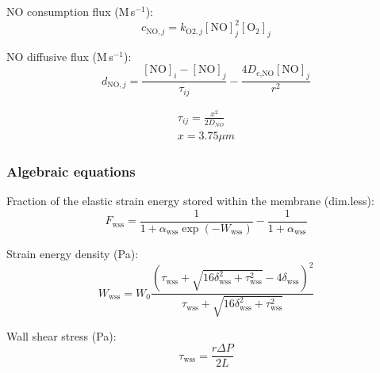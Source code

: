 \documentclass[fleqn]{report}
\numberwithin{equation}{section}
\numberwithin{equation}{section}
\newcommand{\NO}{\text{NO}}
\newcommand{\Otwo}{\text{O$_2$}}
\newcommand{\Ca}{\text{Ca$^{2+}$}}
\newcommand{\uMpers}{\textmu M\,s$^{-1}$}
\newcommand\cNO[1]{\text{$c_{\text{NO},#1}$}}
\newcommand\dNO[1]{\text{$d_{\text{NO},#1}$}}
\begin{document}
				NO consumption flux (\uMpers):
				\begin{equation} 
					\cNO{j} = k_{\text{O2},j} [\NO]_j^2 [\Otwo]_j 
				\end{equation}	
				
				NO diffusive flux (\uMpers):					
				\begin{equation} 
					\dNO{j} = \frac{[\NO]_i - [\NO]_j}{\tau_{ij}} - \frac{4 D_{\text{c,NO}}[\NO]_j}{r^2}
				\end{equation}	

							\begin{eqnarray}
							\tau_{ij}=\frac{x^2}{2D_{NO}}\\
							x=3.75 \mu m
							\end{eqnarray}

	\subsubsection*{Algebraic equations}
	
				
				
				Fraction of the elastic strain energy stored within the membrane (dim.less): %
				\begin{equation} 
					F_{\text{wss}} = \frac{1}{1+\alpha_{\text{wss}} \exp(-W_{\text{wss}})} - \frac{1}{1+\alpha_{\text{wss}}}
				\end{equation}	
				
				Strain energy density (Pa): %
				\begin{equation} 
					W_{\text{wss}} = W_0 \frac{(\tau_{\text{wss}} + \sqrt{16 \delta_{\text{wss}}^2 + \tau_{\text{wss}}^2} - 4 \delta_{\text{wss}})^2}{\tau_{\text{wss}} + \sqrt{16\delta_{\text{wss}}^2 + \tau_{\text{wss}}^2}}
				\end{equation}	
				
				Wall shear stress (Pa): %
				\begin{equation}
					\tau_{\text{wss}} = \frac{r \Delta P}{2 L}
				\end{equation}
				
\end{document}
